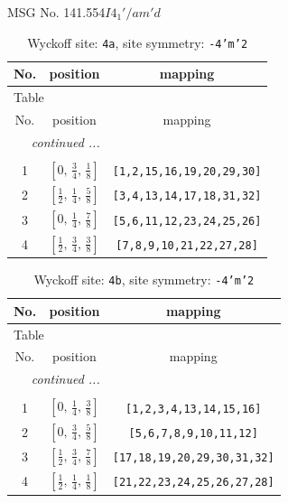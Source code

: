 \documentclass[fleqn,8pt]{jsarticle}
\begin{document}
\setcounter{MaxMatrixCols}{32}

\renewcommand{\tablename}{Table~}
\renewcommand{\figurename}{Figure~}
\begin{center}
\LARGE
MSG No. 141.554\quad$I4_{1}'/am'd$
\end{center}
\renewcommand{\arraystretch}{1.2}
\begin{longtable}{ccc}
\caption{Wyckoff site: {\tt 4a}, site symmetry: {\tt -4'm'2}}
 \\
 \hline \hline
No. & position & mapping \\ \hline \endfirsthead

\multicolumn{2}{l}{\tablename\ \thetable{}} \\
 \hline \hline
No. & position & mapping \\ \hline \endhead

 \hline \hline
\multicolumn{2}{r}{\footnotesize\it continued ...} \\ \endfoot

 \hline \hline
\multicolumn{2}{r}{} \\ \endlastfoot

1 & $\left[ 0,\, \frac{3}{4},\, \frac{1}{8} \right]$ & {\tt [1,2,15,16,19,20,29,30]} \\ \hline
2 & $\left[ \frac{1}{2},\, \frac{1}{4},\, \frac{5}{8} \right]$ & {\tt [3,4,13,14,17,18,31,32]} \\ \hline
3 & $\left[ 0,\, \frac{1}{4},\, \frac{7}{8} \right]$ & {\tt [5,6,11,12,23,24,25,26]} \\ \hline
4 & $\left[ \frac{1}{2},\, \frac{3}{4},\, \frac{3}{8} \right]$ & {\tt [7,8,9,10,21,22,27,28]} \\
\end{longtable}
\renewcommand{\arraystretch}{1.2}
\begin{longtable}{ccc}
\caption{Wyckoff site: {\tt 4b}, site symmetry: {\tt -4'm'2}}
 \\
 \hline \hline
No. & position & mapping \\ \hline \endfirsthead

\multicolumn{2}{l}{\tablename\ \thetable{}} \\
 \hline \hline
No. & position & mapping \\ \hline \endhead

 \hline \hline
\multicolumn{2}{r}{\footnotesize\it continued ...} \\ \endfoot

 \hline \hline
\multicolumn{2}{r}{} \\ \endlastfoot

1 & $\left[ 0,\, \frac{1}{4},\, \frac{3}{8} \right]$ & {\tt [1,2,3,4,13,14,15,16]} \\ \hline
2 & $\left[ 0,\, \frac{3}{4},\, \frac{5}{8} \right]$ & {\tt [5,6,7,8,9,10,11,12]} \\ \hline
3 & $\left[ \frac{1}{2},\, \frac{3}{4},\, \frac{7}{8} \right]$ & {\tt [17,18,19,20,29,30,31,32]} \\ \hline
4 & $\left[ \frac{1}{2},\, \frac{1}{4},\, \frac{1}{8} \right]$ & {\tt [21,22,23,24,25,26,27,28]} \\
\end{longtable}
\end{document}
